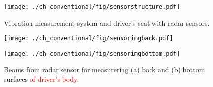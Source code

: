 \begin{figure}[!t]
\centering
\texttt{[image: ./ch\_conventional/fig/sensorstructure.pdf]}
\caption{Vibration measurement system and driver's seat with radar sensors.}
\label{fig:sensorstructure}
\end{figure}

\begin{figure}[htbp]
      \begin{minipage}[t]{0.45\hsize}
        \centering
        \texttt{[image: ./ch\_conventional/fig/sensorimgback.pdf]}
        \label{fig:sensorimgback}
      \end{minipage} 
      \begin{minipage}[t]{0.45\hsize}
        \centering
        \texttt{[image: ./ch\_conventional/fig/sensorimgbottom.pdf]}
        \label{fig:sensorimgbottom}
      \end{minipage} 
     \caption{Beams from radar sensor for measurering (a) back and (b) bottom surfaces \textcolor{red}{of driver's body}.}
     \label{fig:sensorimg}
  \end{figure}


